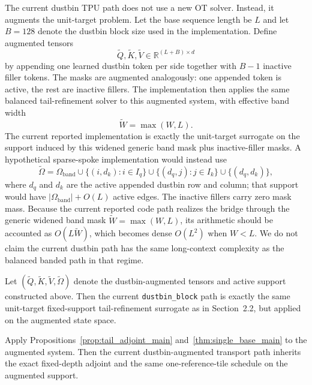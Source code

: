 The current dustbin TPU path does not use a new OT solver. Instead, it augments the unit-target problem. Let the base sequence length be $L$ and let $B=128$ denote the dustbin block size used in the implementation. Define augmented tensors
\[
\widetilde Q,\widetilde K,\widetilde V \in \mathbb{R}^{(L+B)\times d}
\]
by appending one learned dustbin token per side together with $B-1$ inactive filler tokens. The masks are augmented analogously: one appended token is active, the rest are inactive fillers. The implementation then applies the same balanced tail-refinement solver to this augmented system, with effective band width
\[
\widetilde W = \max(W,L).
\]
The current reported implementation is exactly the unit-target surrogate on the support induced by this widened generic band mask plus inactive-filler masks. A hypothetical sparse-spoke implementation would instead use
\[
\widetilde\Omega
=
\Omega_{\mathrm{band}}
\cup
\{(i,d_k): i \in I_q\}
\cup
\{(d_q,j): j \in I_k\}
\cup
\{(d_q,d_k)\},
\]
where $d_q$ and $d_k$ are the active appended dustbin row and column; that support would have $|\Omega_{\mathrm{band}}|+O(L)$ active edges. The inactive fillers carry zero mask mass. Because the current reported code path realizes the bridge through the generic widened band mask $\widetilde W=\max(W,L)$, its arithmetic should be accounted as $O(L\widetilde W)$, which becomes dense $O(L^2)$ when $W<L$. We do not claim the current dustbin path has the same long-context complexity as the balanced banded path in that regime.

\begin{proposition}\label{thm:dustbin_aug}
Let $(\widetilde Q,\widetilde K,\widetilde V,\widetilde\Omega)$ denote the dustbin-augmented tensors and active support constructed above. Then the current \texttt{dustbin\_block} path is exactly the same unit-target fixed-support tail-refinement surrogate as in Section~2.2, but applied on the augmented state space.
\end{proposition}

\begin{corollary}[Exact \texorpdfstring{$R=2$}{R=2} Adjoint on the Augmented State Space]\label{cor:dustbin_r2}
Apply Propositions~\ref{prop:tail_adjoint_main} and~\ref{thm:single_base_main} to the augmented system. Then the current dustbin-augmented transport path inherits the exact fixed-depth adjoint and the same one-reference-tile schedule on the augmented support.
\end{corollary}

